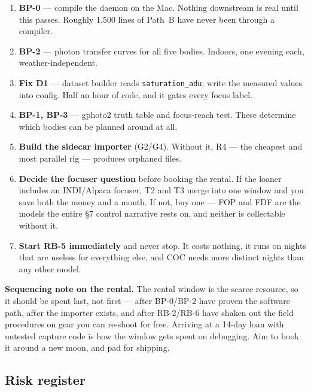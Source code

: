\documentclass[11pt]{article}
\newcommand{\co}[1]{\texttt{\small #1}}
\begin{document}
\begin{enumerate}
\item \textbf{BP-0} --- compile the daemon on the Mac. Nothing downstream is
      real until this passes. Roughly 1,500 lines of Path~B have never been
      through a compiler.
\item \textbf{BP-2} --- photon transfer curves for all five bodies. Indoors,
      one evening each, weather-independent.
\item \textbf{Fix D1} --- dataset builder reads \co{saturation\_adu}; write the
      measured values into config. Half an hour of code, and it gates every
      focus label.
\item \textbf{BP-1, BP-3} --- gphoto2 truth table and focus-reach test. These
      determine which bodies can be planned around at all.
\item \textbf{Build the sidecar importer} (G2/G4). Without it, R4 --- the
      cheapest and most parallel rig --- produces orphaned files.
\item \textbf{Decide the focuser question} before booking the rental. If the
      loaner includes an INDI/Alpaca focuser, T2 and T3 merge into one window
      and you save both the money and a month. If not, buy one --- FOP and FDF
      are the models the entire \S7 control narrative rests on, and neither is
      collectable without it.
\item \textbf{Start RB-5 immediately} and never stop. It costs nothing, it runs
      on nights that are useless for everything else, and COC needs more
      distinct nights than any other model.
\end{enumerate}

\begin{keybox}
\textbf{Sequencing note on the rental.} The rental window is the scarce
resource, so it should be spent last, not first --- after BP-0/BP-2 have proven
the software path, after the importer exists, and after RB-2/RB-6 have shaken
out the field procedures on gear you can re-shoot for free. Arriving at a
14-day loan with untested capture code is how the window gets spent on
debugging. Aim to book it around a new moon, and pad for shipping.
\end{keybox}

\subsection{Risk register}
\end{document}
